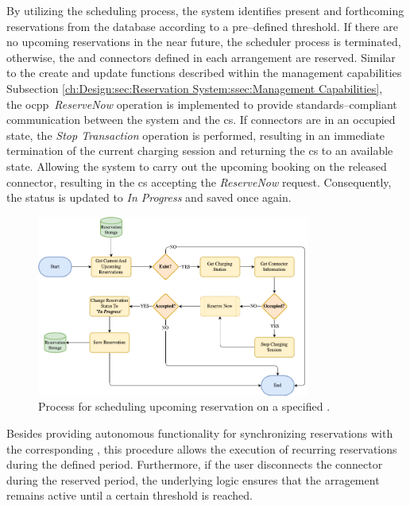 By utilizing the scheduling process, the system identifies present and forthcoming reservations from the database according to a pre--defined threshold.
If there are no upcoming reservations in the near future, the scheduler process is terminated, otherwise, the  and connectors defined in each arrangement are reserved.
Similar to the create and update functions described within the management capabilities Subsection \ref{ch:Design:sec:Reservation System:ssec:Management Capabilities}, \\ the \acrshort{ocpp}~\textit{ReserveNow} operation \cite{noauthor_ocpp_nodate} is implemented to provide standards--compliant communication between the system and the \acrshort{cs}.
If connectors are in an occupied state, the \textit{Stop Transaction} operation is performed, resulting in an immediate termination of the current charging session and returning the \acrshort{cs} to an available state.
Allowing the system to carry out the upcoming booking on the released connector, resulting in the \acrshort{cs} accepting the \textit{ReserveNow} request.
Consequently, the status is updated to \textit{In Progress} and saved once again.

\begin{figure}[h]
    \centering
    \includegraphics[width=0.8\textwidth,keepaspectratio]{resources/images/main/5_design/processes/scheduler/SynchronizeReservation.png}
    \caption{Process for scheduling upcoming reservation on a specified .}
    \label{fig:schedule-reservation-flowchart}
\end{figure}

\noindent Besides providing autonomous functionality for synchronizing reservations with the corresponding , this procedure allows the execution of recurring reservations during the defined period.
Furthermore, if the user disconnects the connector during the reserved period, the underlying logic ensures that the arragement remains active until a certain threshold is reached.

